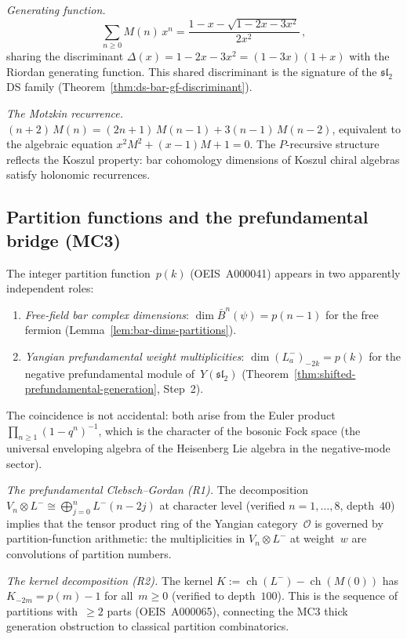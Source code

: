 \emph{Generating function.}
\[
\sum_{n \geq 0} M(n)\,x^n
= \frac{1 - x - \sqrt{1-2x-3x^2}}{2x^2}\,,
\]
sharing the discriminant $\Delta(x) = 1-2x-3x^2 = (1-3x)(1+x)$ with the Riordan generating function. This shared discriminant is the signature of the $\mathfrak{sl}_2$ DS family (Theorem~\ref{thm:ds-bar-gf-discriminant}).

\emph{The Motzkin recurrence.}
$(n+2)\,M(n) = (2n+1)\,M(n-1) + 3(n-1)\,M(n-2)$, equivalent to the algebraic equation $x^2 M^2 + (x-1)M + 1 = 0$. The $P$-recursive structure reflects the Koszul property: bar cohomology dimensions of Koszul chiral algebras satisfy holonomic recurrences.

\subsection{Partition functions and the prefundamental bridge (MC3)}
\label{subsec:partition-prefundamental}

The integer partition function~$p(k)$ (OEIS~A000041)
appears in two apparently independent roles:

\begin{enumerate}[label=\textup{(\roman*)},nosep]
\item \emph{Free-field bar complex dimensions}:
 $\dim\bar{B}^n(\psi) = p(n-1)$ for the free fermion
 (Lemma~\ref{lem:bar-dims-partitions}).
\item \emph{Yangian prefundamental weight multiplicities}:
 $\dim(L^-_a)_{-2k} = p(k)$ for the negative prefundamental module
 of~$Y(\mathfrak{sl}_2)$
 (Theorem~\ref{thm:shifted-prefundamental-generation}, Step~2).
\end{enumerate}

\noindent
The coincidence is not accidental: both arise from the
Euler product $\prod_{n \geq 1}(1-q^n)^{-1}$, which is
the character of the bosonic Fock space (the universal
enveloping algebra of the Heisenberg Lie algebra in the
negative-mode sector).

\emph{The prefundamental Clebsch--Gordan (R1).}
The decomposition $V_n \otimes L^- \cong \bigoplus_{j=0}^{n}
L^-(n-2j)$ at character level (verified $n = 1, \ldots, 8$,
depth~$40$) implies that the tensor product ring of the
Yangian category~$\mathcal{O}$ is governed by partition-function
arithmetic: the multiplicities in $V_n \otimes L^-$ at weight~$w$
are convolutions of partition numbers.

\emph{The kernel decomposition (R2).}
The kernel $K := \operatorname{ch}(L^-) - \operatorname{ch}(M(0))$
has $K_{-2m} = p(m) - 1$ for all~$m \geq 0$
(verified to depth~$100$).
This is the sequence of partitions with~$\geq 2$ parts (OEIS~A000065),
connecting the MC3 thick generation obstruction to classical
partition combinatorics.

